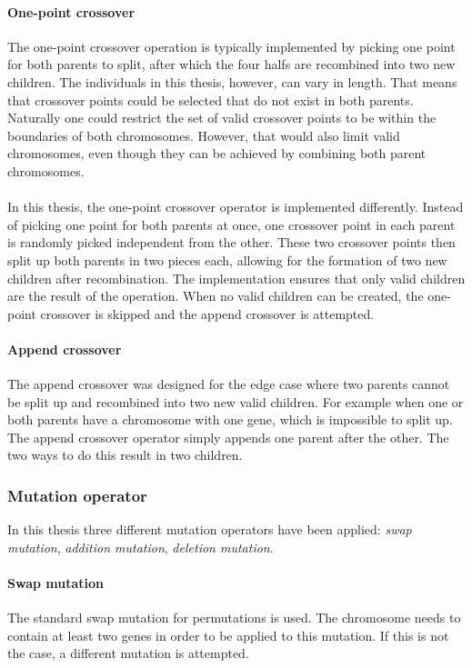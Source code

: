\paragraph{One-point crossover} The one-point crossover operation is typically
implemented by picking one point for both parents to split, after which the
four halfs are recombined into two new children. The individuals in this
thesis, however, can vary in length. That means that crossover points could be
selected that do not exist in both parents. Naturally one could restrict the
set of valid crossover points to be within the boundaries of both chromosomes.
However, that would also limit valid chromosomes, even though they can be
achieved by combining both parent chromosomes.\\\\
\noindent
In this thesis, the one-point crossover operator is implemented differently.
Instead of picking one point for both parents at once, one crossover point in
each parent is randomly picked independent from the other. These two crossover
points then split up both parents in two pieces each, allowing for the
formation of two new children after recombination. The implementation ensures
that only valid children are the result of the operation. When no valid
children can be created, the one-point crossover is skipped and the append
crossover is attempted.

\paragraph{Append crossover} The append crossover was designed for the edge
case where two parents cannot be split up and recombined into two new valid
children. For example when one or both parents have a chromosome with one gene,
which is impossible to split up. The append crossover operator simply appends
one parent after the other. The two ways to do this result in two children.

\subsubsection{Mutation operator}
\label{sec:approach_mutation_operator}
In this thesis three different mutation operators have been
applied: \emph{swap mutation}, \emph{addition mutation}, \emph{deletion mutation}.

\paragraph{Swap mutation} The standard swap mutation for permutations is used.
The chromosome needs to contain at least two genes in order to be applied to
this mutation. If this is not the case, a different mutation is attempted.

